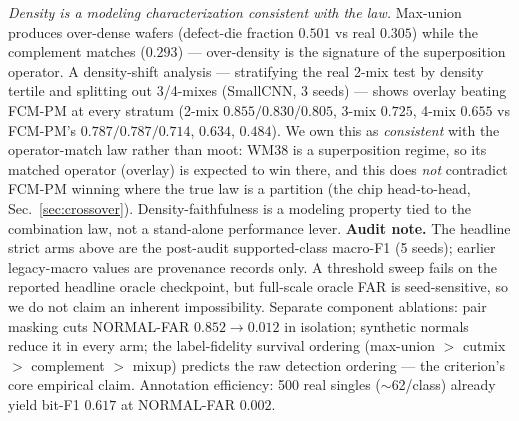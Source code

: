 \documentclass[11pt]{article}
\begin{document}
\emph{Density is a modeling characterization consistent with the law.} Max-union
produces over-dense wafers (defect-die fraction $0.501$ vs real $0.305$) while the
complement matches ($0.293$) --- over-density is the signature of the superposition
operator. A density-shift analysis --- stratifying the real 2-mix test by density
tertile and splitting out 3/4-mixes (SmallCNN, 3 seeds) --- shows overlay beating
FCM-PM at every stratum (2-mix $0.855/0.830/0.805$, 3-mix $0.725$, 4-mix $0.655$ vs
FCM-PM's $0.787/0.787/0.714$, $0.634$, $0.484$). We own this as \emph{consistent} with
the operator-match law rather than moot: WM38 is a superposition regime, so its matched
operator (overlay) is expected to win there, and this does \emph{not} contradict FCM-PM
winning where the true law is a partition (the chip head-to-head,
Sec.~\ref{sec:crossover}). Density-faithfulness is a modeling property tied to the
combination law, not a stand-alone performance lever. \textbf{Audit note.} The headline
strict arms above are the post-audit
supported-class macro-F1 (5 seeds); earlier legacy-macro values are provenance
records only. A threshold sweep fails on the reported headline oracle checkpoint, but
full-scale oracle FAR is seed-sensitive, so we do not claim an inherent
impossibility. Separate component ablations: pair masking cuts NORMAL-FAR $0.852 \to
0.012$ in isolation; synthetic normals reduce it in every arm; the label-fidelity
survival ordering (max-union $>$ cutmix $>$ complement $>$ mixup) predicts the raw
detection ordering --- the criterion's core empirical claim. Annotation efficiency:
500 real singles ($\sim$62/class) already yield bit-F1 $0.617$ at NORMAL-FAR $0.002$.
\end{document}
